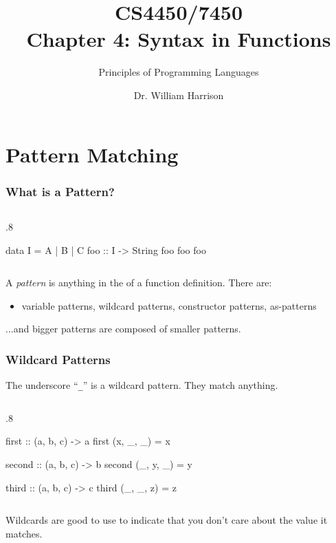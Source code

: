 \documentclass{beamer}
\title[CS4450]{CS4450/7450\\Chapter 4: Syntax in Functions}
\subtitle{Principles of Programming Languages}
\author[Bill Harrison]{Dr. William Harrison}
\institute{University of Missouri}
\newenvironment{codeblock}[1][.8]{%
\begin{columns}
\begin{column}{#1\linewidth}
\begin{exampleblock}{}}{%
\end{exampleblock}
\end{column}
\end{columns}}
\begin{document}
\frame{\titlepage}



\section{Pattern Matching}


\begin{frame}[fragile]
\frametitle{What is a Pattern?}

\begin{codeblock}
\begin{hcode}
data I = A | B | C
foo :: I -> String
foo %
foo %
foo %
\end{hcode}
\end{codeblock}
\vfill

A \emph{pattern} is anything in the {\color{red}{argument position}} of a function definition. \pause
There are:
\begin{itemize}
\item variable patterns, wildcard patterns, constructor patterns, as-patterns
\end{itemize}
...and bigger patterns are composed of smaller patterns.

\end{frame}

\begin{frame}[fragile]
\frametitle{Wildcard Patterns}

The underscore ``\verb+_+'' is a wildcard pattern. They match anything.

\begin{codeblock}
\begin{hcode}
first :: (a, b, c) -> a  
first (x, _, _) = x  
  
second :: (a, b, c) -> b  
second (_, y, _) = y  
  
third :: (a, b, c) -> c  
third (_, _, z) = z 
\end{hcode}
\end{codeblock}
\vfill

Wildcards are good to use to indicate that you don't care about the value it matches.

\end{frame}
\end{document}
